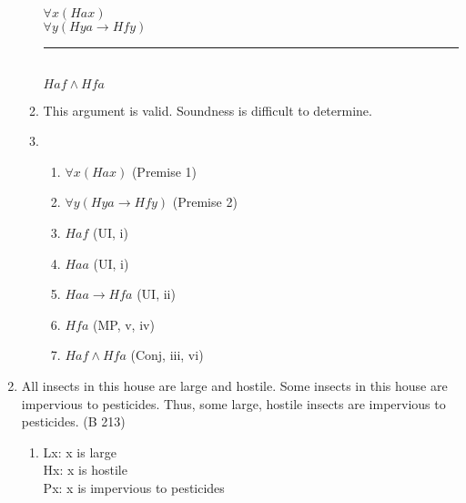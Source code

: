 \documentclass{article}
\begin{document}
\begin{enumerate}
\begin{enumerate}
                        $\forall x(Hax)$\\
                        $\forall y(Hya \to Hfy)$\\
                        \rule{15em}{.5pt}\\
                        $Haf \land Hfa$
                  \item This argument is valid. Soundness is difficult to determine.
                        \setcounter{enumii}{3}
                  \item \begin{enumerate}
                              \item $\forall x(Hax)$ (Premise 1)
                              \item $\forall y(Hya \to Hfy)$ (Premise 2)
                              \item $Haf$ (UI, i)
                              \item $Haa$ (UI, i)
                              \item $Haa \to Hfa$ (UI, ii)
                              \item $Hfa$ (MP, v, iv)
                              \item $Haf \land Hfa$ (Conj, iii, vi)
                        \end{enumerate}
            \end{enumerate}
      \item All insects in this house are large and hostile. Some insects in this house are impervious to pesticides. Thus, some large, hostile insects are impervious to pesticides. (B 213)
            \begin{enumerate}
                  \item Lx: x is large\\
                        Hx: x is hostile\\
                        Px: x is impervious to pesticides\\


\end{enumerate}
\end{enumerate}
\end{document}
